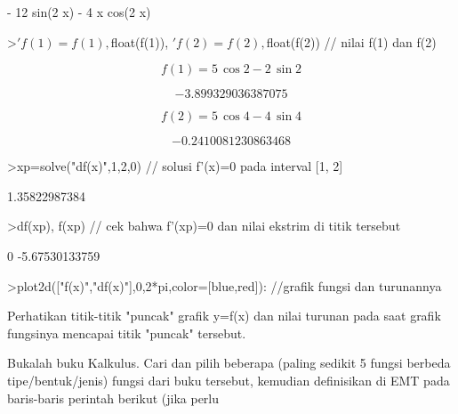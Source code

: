 \documentclass[12pt,arial,letterpaper]{book}
\begin{document}
\begin{eulercomment}
\begin{eulercomment}
\begin{eulercomment}
\begin{eulercomment}
\begin{eulercomment}
\begin{eulercomment}
\begin{eulercomment}
\begin{eulercomment}
\begin{eulercomment}
\begin{eulercomment}
\begin{eulercomment}
\begin{eulercomment}
\begin{eulercomment}
\begin{eulercomment}
\begin{eulercomment}
\begin{eulercomment}
\begin{eulercomment}
\begin{eulercomment}
\begin{eulercomment}
\begin{eulercomment}
\begin{eulercomment}
\begin{eulercomment}
\begin{euleroutput}
                       - 12 sin(2 x) - 4 x cos(2 x)
  
\end{euleroutput}
\begin{eulerprompt}
>$'f(1)=f(1), $float(f(1)), $'f(2)=f(2), $float(f(2)) // nilai f(1) dan f(2)
\end{eulerprompt}
\begin{eulerformula}
\[
f\left(1\right)=5\,\cos 2-2\,\sin 2
\]
\end{eulerformula}
\begin{eulerformula}
\[
-3.899329036387075
\]
\end{eulerformula}
\begin{eulerformula}
\[
f\left(2\right)=5\,\cos 4-4\,\sin 4
\]
\end{eulerformula}
\begin{eulerformula}
\[
-0.2410081230863468
\]
\end{eulerformula}
\begin{eulerprompt}
>xp=solve("df(x)",1,2,0) // solusi f'(x)=0 pada interval [1, 2]
\end{eulerprompt}
\begin{euleroutput}
  1.35822987384
\end{euleroutput}
\begin{eulerprompt}
>df(xp), f(xp) // cek bahwa f'(xp)=0 dan nilai ekstrim di titik tersebut
\end{eulerprompt}
\begin{euleroutput}
  0
  -5.67530133759
\end{euleroutput}
\begin{eulerprompt}
>plot2d(["f(x)","df(x)"],0,2*pi,color=[blue,red]): //grafik fungsi dan turunannya
\end{eulerprompt}
\begin{eulercomment}
Perhatikan titik-titik "puncak" grafik y=f(x) dan nilai turunan pada saat grafik fungsinya mencapai titik "puncak" tersebut.
\end{eulercomment}
\begin{eulercomment}
Bukalah buku Kalkulus. Cari dan pilih beberapa (paling sedikit 5
fungsi berbeda tipe/bentuk/jenis) fungsi dari buku tersebut, kemudian
definisikan di EMT pada baris-baris perintah berikut (jika perlu

\end{eulercomment}
\end{eulercomment}
\end{eulercomment}
\end{eulercomment}
\end{eulercomment}
\end{eulercomment}
\end{eulercomment}
\end{eulercomment}
\end{eulercomment}
\end{eulercomment}
\end{eulercomment}
\end{eulercomment}
\end{eulercomment}
\end{eulercomment}
\end{eulercomment}
\end{eulercomment}
\end{eulercomment}
\end{eulercomment}
\end{eulercomment}
\end{eulercomment}
\end{eulercomment}
\end{eulercomment}
\end{eulercomment}
\end{document}
